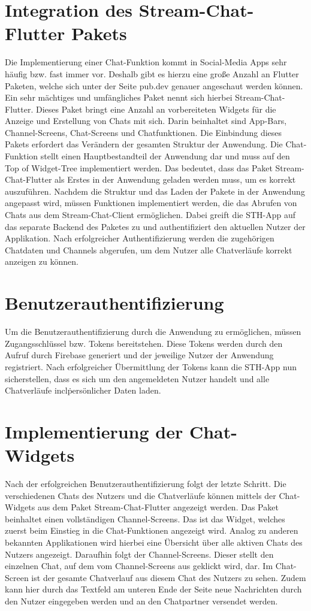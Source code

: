 \section{Integration des Stream-Chat-Flutter Pakets}
Die Implementierung einer Chat-Funktion kommt in Social-Media Apps sehr häufig bzw. fast immer vor. Deshalb gibt es hierzu eine große Anzahl an Flutter Paketen, welche sich unter der Seite pub.dev genauer angeschaut werden können. Ein sehr mächtiges und umfängliches Paket nennt sich hierbei Stream-Chat-Flutter. Dieses Paket bringt eine Anzahl an vorbereiteten Widgets für die Anzeige und Erstellung von Chats mit sich. Darin beinhaltet sind App-Bars, Channel-Screens, Chat-Screens und Chatfunktionen. Die Einbindung dieses Pakets erfordert das Verändern der gesamten Struktur der Anwendung. Die Chat-Funktion stellt einen Hauptbestandteil der Anwendung dar und muss auf den Top of Widget-Tree implementiert werden. Das bedeutet, dass das Paket Stream-Chat-Flutter als Erstes in der Anwendung geladen werden muss, um es korrekt auszuführen. Nachdem die Struktur und das Laden der Pakete in der Anwendung angepasst wird, müssen Funktionen implementiert werden, die das Abrufen von Chats aus dem Stream-Chat-Client ermöglichen. Dabei greift die STH-App auf das separate Backend des Paketes zu und authentifiziert den aktuellen Nutzer der Applikation. Nach erfolgreicher Authentifizierung werden die zugehörigen Chatdaten und Channels abgerufen, um dem Nutzer alle Chatverläufe korrekt anzeigen zu können.

\section{Benutzerauthentifizierung}
Um die Benutzerauthentifizierung durch die Anwendung zu ermöglichen, müssen Zugangsschlüssel bzw. Tokens bereitstehen. Diese Tokens werden durch den Aufruf durch Firebase generiert und der jeweilige Nutzer der Anwendung registriert. Nach erfolgreicher Übermittlung der Tokens kann die STH-App nun sicherstellen, dass es sich um den angemeldeten Nutzer handelt und alle Chatverläufe incl\. persönlicher Daten laden. 

\section{Implementierung der Chat-Widgets}
Nach der erfolgreichen Benutzerauthentifizierung folgt der letzte Schritt. Die verschiedenen Chats des Nutzers und die Chatverläufe können mittels der Chat-Widgets aus dem Paket Stream-Chat-Flutter angezeigt werden. Das Paket beinhaltet einen vollständigen Channel-Screens. Das ist das Widget, welches zuerst beim Einstieg in die Chat-Funktionen angezeigt wird. Analog zu anderen bekannten Applikationen wird hierbei eine Übersicht über alle aktiven Chats des Nutzers angezeigt. Daraufhin folgt der Channel-Screens. Dieser stellt den einzelnen Chat, auf dem vom Channel-Screens aus geklickt wird, dar. Im Chat-Screen ist der gesamte Chatverlauf aus diesem Chat des Nutzers zu sehen. Zudem kann hier durch das Textfeld am unteren Ende der Seite neue Nachrichten durch den Nutzer eingegeben werden und an den Chatpartner versendet werden.

